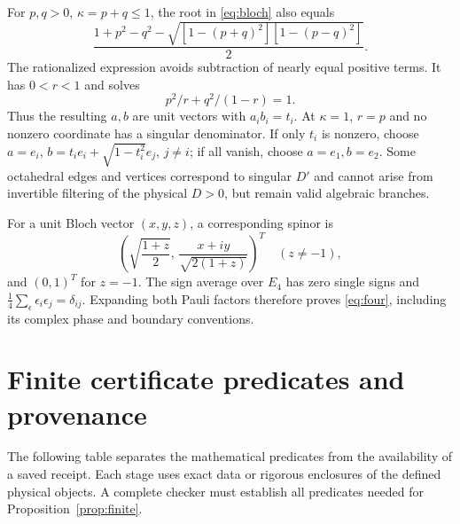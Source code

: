 \documentclass[11pt,a4paper]{article}
\theoremstyle{definition}\newtheorem{definition}[theorem]{Definition}
\theoremstyle{remark}\newtheorem{remark}[theorem]{Remark}
\numberwithin{equation}{section}
\begin{document}
For $p,q>0$, $\kappa=p+q\le1$, the root in \eqref{eq:bloch}
also equals
\[
\frac{1+p^2-q^2-\sqrt{[1-(p+q)^2][1-(p-q)^2]}}{2}.
\]
The rationalized expression avoids subtraction of nearly equal
positive terms. It has $0<r<1$ and solves
\[
p^2/r+q^2/(1-r)=1.
\]
Thus the resulting $a,b$ are unit vectors with $a_ib_i=t_i$.
At $\kappa=1$, $r=p$ and no nonzero coordinate has a singular denominator.
If only $t_i$ is nonzero, choose
$a=e_i$, $b=t_ie_i+\sqrt{1-t_i^2}e_j$, $j\ne i$;
if all vanish, choose $a=e_1,b=e_2$.
Some octahedral edges and vertices correspond to singular $D'$
and cannot arise from invertible filtering of the physical $D>0$,
but remain valid algebraic branches.

For a unit Bloch vector $(x,y,z)$, a corresponding spinor is
\[
\left(\sqrt{\frac{1+z}{2}},\,
 \frac{x+iy}{\sqrt{2(1+z)}}\right)^T\quad(z\ne-1),
\]
and $(0,1)^T$ for $z=-1$.
The sign average over $E_4$ has zero single signs and
$\frac14\sum_\epsilon\epsilon_i\epsilon_j=\delta_{ij}$.
Expanding both Pauli factors therefore proves \eqref{eq:four},
including its complex phase and boundary conventions.

\section{Finite certificate predicates and provenance}\label{app:verification}
The following table separates the mathematical predicates from
the availability of a saved receipt. Each stage uses exact data or
rigorous enclosures of the defined physical objects.
A complete checker must establish all predicates needed for
Proposition~\ref{prop:finite}.
\end{document}

